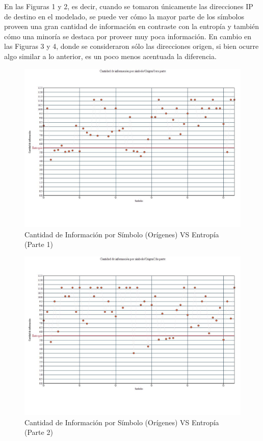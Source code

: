 En las Figuras 1 y 2, es decir, cuando se tomaron únicamente las direcciones IP de destino en el modelado, se puede ver cómo la mayor parte de los símbolos proveen una gran cantidad de información en contraste con la entropía y también cómo una minoría se destaca por proveer muy poca información. En cambio en las Figuras 3 y 4, donde se consideraron sólo las direcciones origen, si bien ocurre algo similar a lo anterior, es un poco menos acentuada la diferencia.

\begin{figure}[H]
  \centering
    \includegraphics[scale=0.45]{imagenes/graficos/entropiaCantInf/02origen1eraParte.jpg}
  \caption{Cantidad de Información por Símbolo (Orígenes) VS Entropía (Parte 1)}
  \label{fig:ejemplo}
\end{figure}


\begin{figure}[H]
  \centering
    \includegraphics[scale=0.45]{imagenes/graficos/entropiaCantInf/02origen2daParte.jpg}
  \caption{Cantidad de Información por Símbolo (Orígenes) VS Entropía (Parte 2)}
  \label{fig:ejemplo}
\end{figure}


